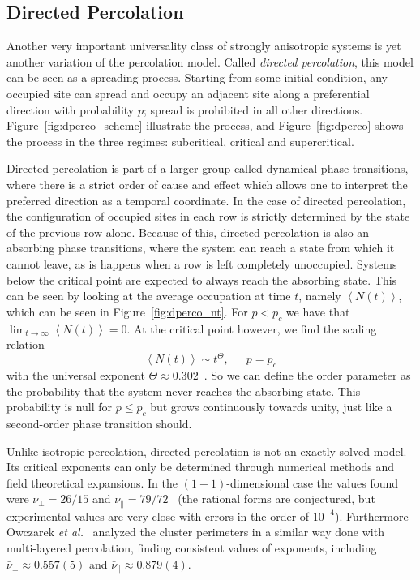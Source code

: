 \subsection{Directed Percolation}
\label{sec:dp}

Another very important universality class of strongly anisotropic systems is
yet another variation of the percolation model. Called \textit{directed
percolation}, this model can be seen as a spreading process. Starting from
some initial condition, any occupied site can spread and occupy an adjacent
site along a preferential direction with probability $p$; spread is prohibited
in all other directions. Figure~\ref{fig:dperco_scheme} illustrate the process,
and Figure~\ref{fig:dperco} shows the process in the three regimes:
subcritical, critical and supercritical.

Directed percolation is part of a larger group called dynamical phase
transitions, where there is a strict order of cause and effect which allows one
to interpret the preferred direction as a temporal coordinate. In the case of
directed percolation, the configuration of occupied sites in each row is
strictly determined by the state of the previous row alone. Because of this,
directed percolation is also an absorbing phase transitions, where the system
can reach a state from which it cannot leave, as is happens when a row is left
completely unoccupied. Systems below the critical point are expected to always
reach the absorbing state. This can be seen by looking at the average
occupation at time $t$, namely $\left\langle N(t)\right\rangle$, which can be
seen in Figure~\ref{fig:dperco_nt}. For $p<p_c$ we have that
$\lim_{t\rightarrow\infty}\left\langle N(t)\right\rangle=0$. At the critical
point however, we find the scaling relation
\begin{equation}
    \left\langle N\left(t\right)\right\rangle \sim t^{\Theta},
    \,\,\,\,\,\,\,\,\,
    p=p_c
\end{equation}
with the universal exponent $\Theta\approx0.302$~\cite{Henkel2008}. So we can
define the order parameter as the probability that the system never reaches the
absorbing state. This probability is null for $p\leq p_c$ but grows
continuously towards unity, just like a second-order phase transition should.

Unlike isotropic percolation, directed percolation is not an exactly solved
model. Its critical exponents can only be determined through numerical methods
and field theoretical expansions. In the $(1+1)$-dimensional case the values
found were $\nu_\perp=26/15$ and $\nu_\parallel=79/72$~\cite{Hinrichsen2000}
(the rational forms are conjectured, but experimental values are very close
with errors in the order of $10^{-4}$). Furthermore Owczarek \textit{et
al.}~\cite{Owczarek1997} analyzed the cluster perimeters in a similar way
done with multi-layered percolation, finding consistent values of exponents,
including $\bar{\nu}_\perp\approx0.557(5)$ and
$\bar{\nu}_\parallel\approx0.879(4)$.


